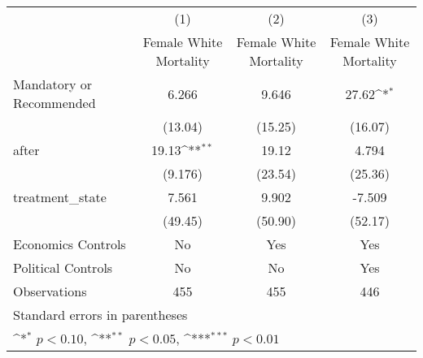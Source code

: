 {
\def\sym#1{\ifmmode^{#1}\else\(^{#1}\)\fi}
\begin{longtable}{l*{3}{c}}
\hline\hline\endfirsthead\hline\endhead\hline\endfoot\endlastfoot
                    &\multicolumn{1}{c}{(1)}&\multicolumn{1}{c}{(2)}&\multicolumn{1}{c}{(3)}\\
                    &\multicolumn{1}{c}{Female White Mortality}&\multicolumn{1}{c}{Female White Mortality}&\multicolumn{1}{c}{Female White Mortality}\\
\hline
Mandatory or Recommended&       6.266         &       9.646         &       27.62\sym{*}  \\
                    &     (13.04)         &     (15.25)         &     (16.07)         \\
[1em]
after               &       19.13\sym{**} &       19.12         &       4.794         \\
                    &     (9.176)         &     (23.54)         &     (25.36)         \\
[1em]
treatment\_state     &       7.561         &       9.902         &      -7.509         \\
                    &     (49.45)         &     (50.90)         &     (52.17)         \\
[1em]
Economics Controls  &          No         &         Yes         &         Yes         \\
[1em]
Political Controls  &          No         &          No         &         Yes         \\
\hline
Observations        &         455         &         455         &         446         \\
\hline\hline
\multicolumn{4}{l}{\footnotesize Standard errors in parentheses}\\
\multicolumn{4}{l}{\footnotesize \sym{*} \(p<0.10\), \sym{**} \(p<0.05\), \sym{***} \(p<0.01\)}\\
\end{longtable}
}
